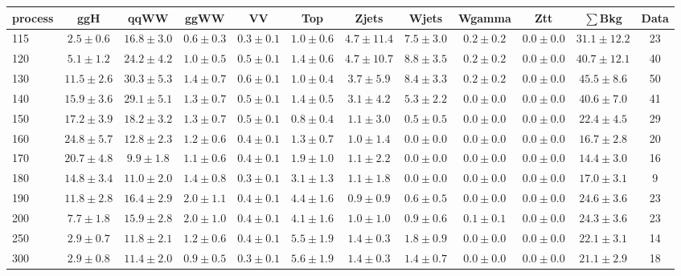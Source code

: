 \begin{table}
{\footnotesize
 \begin{center}
 \begin{tabular}{l c c c c c c c c c c c }
 \hline
 process & ggH & qqWW & ggWW & VV & Top & Zjets & Wjets & Wgamma & Ztt & $\sum$Bkg & Data \\
 \hline
115 & $2.5\pm0.6$ & $16.8\pm3.0$ & $0.6\pm0.3$ & $0.3\pm0.1$ & $1.0\pm0.6$ & $4.7\pm11.4$ & $7.5\pm3.0$ & $0.2\pm0.2$ & $0.0\pm0.0$ & $31.1\pm12.2$ & 23 \\
120 & $5.1\pm1.2$ & $24.2\pm4.2$ & $1.0\pm0.5$ & $0.5\pm0.1$ & $1.4\pm0.6$ & $4.7\pm10.7$ & $8.8\pm3.5$ & $0.2\pm0.2$ & $0.0\pm0.0$ & $40.7\pm12.1$ & 40 \\
130 & $11.5\pm2.6$ & $30.3\pm5.3$ & $1.4\pm0.7$ & $0.6\pm0.1$ & $1.0\pm0.4$ & $3.7\pm5.9$ & $8.4\pm3.3$ & $0.2\pm0.2$ & $0.0\pm0.0$ & $45.5\pm8.6$ & 50 \\
140 & $15.9\pm3.6$ & $29.1\pm5.1$ & $1.3\pm0.7$ & $0.5\pm0.1$ & $1.4\pm0.5$ & $3.1\pm4.2$ & $5.3\pm2.2$ & $0.0\pm0.0$ & $0.0\pm0.0$ & $40.6\pm7.0$ & 41 \\
150 & $17.2\pm3.9$ & $18.2\pm3.2$ & $1.3\pm0.7$ & $0.5\pm0.1$ & $0.8\pm0.4$ & $1.1\pm3.0$ & $0.5\pm0.5$ & $0.0\pm0.0$ & $0.0\pm0.0$ & $22.4\pm4.5$ & 29 \\
160 & $24.8\pm5.7$ & $12.8\pm2.3$ & $1.2\pm0.6$ & $0.4\pm0.1$ & $1.3\pm0.7$ & $1.0\pm1.4$ & $0.0\pm0.0$ & $0.0\pm0.0$ & $0.0\pm0.0$ & $16.7\pm2.8$ & 20 \\
170 & $20.7\pm4.8$ & $9.9\pm1.8$ & $1.1\pm0.6$ & $0.4\pm0.1$ & $1.9\pm1.0$ & $1.1\pm2.2$ & $0.0\pm0.0$ & $0.0\pm0.0$ & $0.0\pm0.0$ & $14.4\pm3.0$ & 16 \\
180 & $14.8\pm3.4$ & $11.0\pm2.0$ & $1.4\pm0.8$ & $0.3\pm0.1$ & $3.1\pm1.3$ & $1.1\pm1.8$ & $0.0\pm0.0$ & $0.0\pm0.0$ & $0.0\pm0.0$ & $17.0\pm3.1$ & 9 \\
190 & $11.8\pm2.8$ & $16.4\pm2.9$ & $2.0\pm1.1$ & $0.4\pm0.1$ & $4.4\pm1.6$ & $0.9\pm0.9$ & $0.6\pm0.5$ & $0.0\pm0.0$ & $0.0\pm0.0$ & $24.6\pm3.6$ & 23 \\
200 & $7.7\pm1.8$ & $15.9\pm2.8$ & $2.0\pm1.0$ & $0.4\pm0.1$ & $4.1\pm1.6$ & $1.0\pm1.0$ & $0.9\pm0.6$ & $0.1\pm0.1$ & $0.0\pm0.0$ & $24.3\pm3.6$ & 23 \\
250 & $2.9\pm0.7$ & $11.8\pm2.1$ & $1.2\pm0.6$ & $0.4\pm0.1$ & $5.5\pm1.9$ & $1.4\pm0.3$ & $1.8\pm0.9$ & $0.0\pm0.0$ & $0.0\pm0.0$ & $22.1\pm3.1$ & 14 \\
300 & $2.9\pm0.8$ & $11.4\pm2.0$ & $0.9\pm0.5$ & $0.3\pm0.1$ & $5.6\pm1.9$ & $1.4\pm0.3$ & $1.4\pm0.7$ & $0.0\pm0.0$ & $0.0\pm0.0$ & $21.1\pm2.9$ & 18 \\

\end{tabular}
\end{center}}
\end{table}
